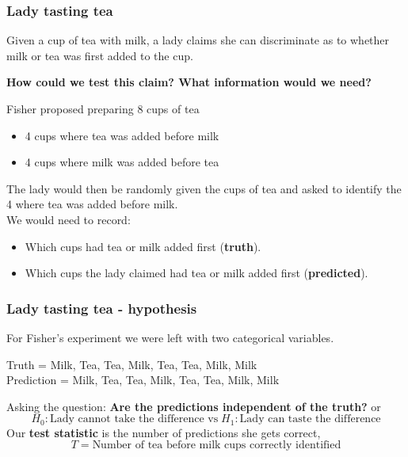 \documentclass[a4paper]{article}
\begin{document}
\subsubsection{Lady tasting tea}
Given a cup of tea with milk, a lady claims she can discriminate as to whether milk or tea was first added to the cup.
\begin{greenbox}
	\textbf{How could we test this claim? What information would we need?}
\end{greenbox}
Fisher proposed preparing 8 cups of tea
\begin{itemize}
	\item 4 cups where tea was added before milk
	\item 4 cups where milk was added before tea
\end{itemize}
The lady would then be randomly given the cups of tea and asked to identify the 4 where tea was added before milk.\\
We would need to record:
\begin{itemize}
	\item Which cups had tea or milk added first (\textbf{truth}).
	\item Which cups the lady claimed had tea or milk added first (\textbf{predicted}).
\end{itemize}
\subsubsection{Lady tasting tea - hypothesis}
For Fisher's experiment we were left with two categorical variables.
\begin{center}
	Truth = Milk, Tea, Tea, Milk, Tea, Tea, Milk, Milk\\
	Prediction = Milk, Tea, Tea, Milk, Tea, Tea, Milk, Milk
\end{center}
Asking the question: \textbf{Are the predictions independent of the truth?} or
\[
	H_0: \text{Lady cannot take the difference vs}\; H_1: \text{Lady can taste the difference}
\]
Our \textbf{test statistic} is the number of predictions she gets correct,
\[
	T = \text{Number of tea before milk cups correctly identified}
\]
\end{document}
